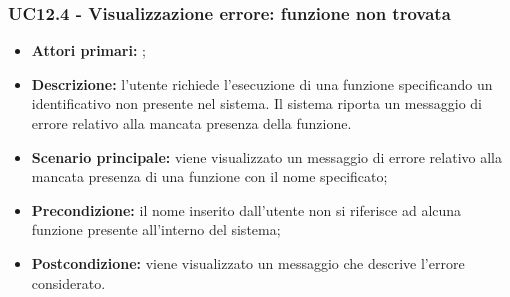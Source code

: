 \subsubsection{UC12.4 - Visualizzazione errore: funzione non trovata}
\begin{itemize}
	\item \textbf{Attori primari:} \ua{};
	\item \textbf{Descrizione:}  l’utente richiede l’esecuzione di una funzione specificando un identificativo non presente nel sistema. Il sistema riporta un messaggio di errore relativo alla mancata presenza della funzione.
	\item \textbf{Scenario principale:} viene visualizzato un messaggio di errore relativo alla mancata presenza di una funzione con il nome specificato; 
	\item \textbf{Precondizione:} il nome inserito dall’utente non si riferisce ad alcuna funzione presente all’interno del sistema;  
	\item \textbf{Postcondizione:} viene visualizzato un messaggio che descrive l’errore considerato. 
\end{itemize}